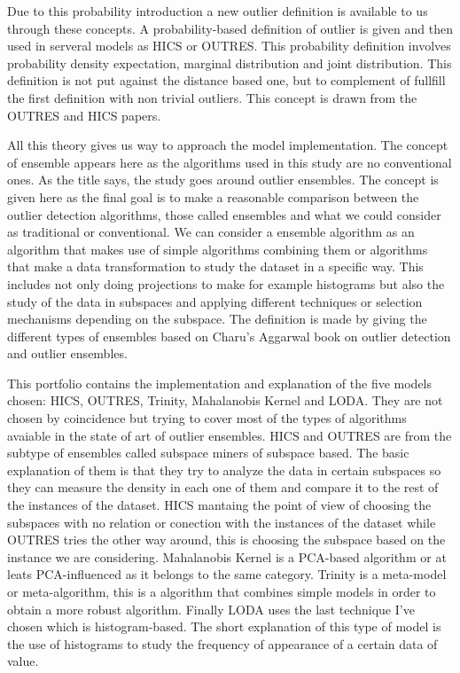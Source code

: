 Due to this probability introduction a new outlier definition is available to us through these concepts. A probability-based definition of outlier is given and then used in serveral models as HICS or OUTRES. This probability definition involves probability density expectation, marginal distribution and joint distribution. This definition is not put against the distance based one, but to complement of fullfill the first definition with non trivial outliers. This concept is drawn from the OUTRES and HICS papers.

All this theory gives us way to approach the model implementation. The concept of ensemble appears here as the algorithms used in this study are no conventional ones. As the title says, the study goes around outlier ensembles. The concept is given here as the final goal is to make a reasonable comparison between the outlier detection algorithms, those called ensembles and what we could consider as traditional or conventional. We can consider a ensemble algorithm as an algorithm that makes use of simple algorithms combining them or algorithms that make a data transformation to study the dataset in a specific way. This includes not only doing projections to make for example histograms but also the study of the data in subspaces and applying different techniques or selection mechanisms depending on the subspace. The definition is made by giving the different types of ensembles based on Charu's Aggarwal book on outlier detection and outlier ensembles.

This portfolio contains the implementation and explanation of the five models chosen: HICS, OUTRES, Trinity, Mahalanobis Kernel and LODA. They are not chosen by coincidence but trying to cover most of the types of algorithms avaiable in the state of art of outlier ensembles. HICS and OUTRES are from the subtype of ensembles called subspace miners of subspace based. The basic explanation of them is that they try to analyze the data in certain subspaces so they can measure the density in each one of them and compare it to the rest of the instances of the dataset. HICS mantaing the point of view of choosing the subspaces with no relation or conection with the instances of the dataset while OUTRES tries the other way around, this is choosing the subspace based on the instance we are considering. Mahalanobis Kernel is a PCA-based algorithm or at leats PCA-influenced as it belongs to the same category. Trinity is a meta-model or meta-algorithm, this is a algorithm that combines simple models in order to obtain a more robust algorithm. Finally LODA uses the last technique I've chosen which is histogram-based. The short explanation of this type of model is the use of histograms to study the frequency of appearance of a certain data of value.

